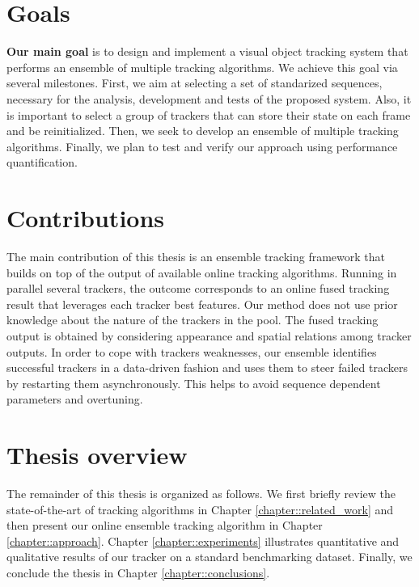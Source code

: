 \section{Goals} \label{sec::goals}

\textbf{Our main goal} is to design and implement a visual object tracking
system that performs an ensemble of multiple tracking algorithms. We achieve
this goal via several milestones. First, we
aim at selecting a set of standarized sequences, necessary for the analysis,
development and tests of the proposed system. Also, it is important to
select a group of trackers that can store their state on each frame and be
reinitialized. Then, we seek to develop an ensemble of multiple tracking
algorithms. Finally, we plan to test and verify our approach using performance
quantification. 

\section{Contributions}

The main contribution of this thesis is an ensemble tracking
framework that builds on top of the output of available online tracking
algorithms. Running in parallel several trackers, the outcome corresponds to
an online fused tracking result that
leverages each tracker best features. Our method does not use prior knowledge
about the nature of the trackers in the pool.
The fused tracking output is obtained by considering appearance and spatial
relations among tracker outputs.
In order to cope with trackers weaknesses,
our ensemble identifies successful trackers in a data-driven fashion
and uses them to steer failed trackers by restarting them asynchronously.
This helps to avoid sequence dependent parameters and overtuning.

\section{Thesis overview}

The remainder of this thesis is organized as follows.
We first briefly review the state-of-the-art of tracking algorithms
in Chapter \ref{chapter::related_work} and
then present our online ensemble tracking algorithm
in Chapter \ref{chapter::approach}.
Chapter \ref{chapter::experiments} illustrates quantitative and qualitative results of our
tracker on a standard benchmarking dataset.
Finally, we conclude the thesis in Chapter \ref{chapter::conclusions}.